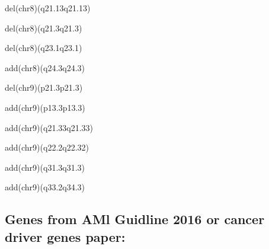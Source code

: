 \documentclass[]{article}
\begin{document}
del(chr8)(q21.13q21.13)

del(chr8)(q21.3q21.3)

del(chr8)(q23.1q23.1)

add(chr8)(q24.3q24.3)

del(chr9)(p21.3p21.3)

add(chr9)(p13.3p13.3)

add(chr9)(q21.33q21.33)

add(chr9)(q22.2q22.32)

add(chr9)(q31.3q31.3)

add(chr9)(q33.2q34.3)

\hypertarget{genes-from-aml-guidline-2016-or-cancer-driver-genes-paper}{%
\subsection{Genes from AMl Guidline 2016 or cancer driver genes
paper:}\label{genes-from-aml-guidline-2016-or-cancer-driver-genes-paper}}
\end{document}
